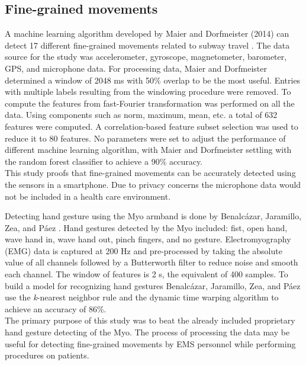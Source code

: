 \subsection{Fine-grained movements}
A machine learning algorithm developed by Maier and Dorfmeister (2014) can detect 17 different fine-grained movements related to subway travel \cite{Dorfmeister2014}. The data source for the study was accelerometer, gyroscope, magnetometer, barometer, GPS, and microphone data. For processing data, Maier and Dorfmeister  determined a window of 2048 ms with 50\% overlap to be the most useful. Entries with multiple labels resulting from the windowing procedure were removed.  To compute the features from fast-Fourier transformation was performed on all the data. Using components such as norm, maximum, mean, etc. a total of 632 features were computed. A correlation-based feature subset selection was used to reduce it to 80 features. No parameters were set to adjust the performance of different machine learning algorithm, with Maier and Dorfmeister settling with the random forest classifier to achieve a 90\% accuracy.\\
This study proofs that fine-grained movements can be accurately detected using the sensors in a smartphone. Due to privacy concerns the microphone data would not be included in a health care environment.
\par Detecting hand gesture using the Myo armband is done by Benalc{\'{a}}zar, Jaramillo, Zea, and P{\'{a}}ez \cite{Benalcazar2017}. Hand gestures detected by the Myo included: fist, open hand, wave hand in, wave hand out, pinch fingers, and no gesture. Electromyography (\gls{EMG}) data is captured at 200 Hz and pre-processed by taking the absolute value of all channels followed by a Butterworth filter to reduce noise and smooth each channel. The window of features is 2 s, the equivalent of 400 samples. To build a model for recognizing hand gestures Benalc{\'{a}}zar, Jaramillo, Zea, and P{\'{a}}ez use the \emph{k}-nearest neighbor rule and the dynamic time warping algorithm to achieve an accuracy of 86\%.\\
The primary purpose of this study was to beat the already included proprietary hand gesture detecting of the Myo. The process of processing the data may be useful for detecting fine-grained movements by EMS personnel while performing procedures on patients.
